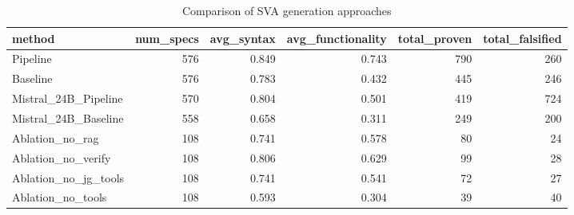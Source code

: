 \begin{table}[htbp]
\centering
\caption{Comparison of SVA generation approaches}
\begin{tabular}{lrrrrr}
\toprule
method & num\_specs & avg\_syntax & avg\_functionality & total\_proven & total\_falsified \\
\midrule
Pipeline & 576 & 0.849 & 0.743 & 790 & 260 \\
Baseline & 576 & 0.783 & 0.432 & 445 & 246 \\
Mistral\_24B\_Pipeline & 570 & 0.804 & 0.501 & 419 & 724 \\
Mistral\_24B\_Baseline & 558 & 0.658 & 0.311 & 249 & 200 \\
Ablation\_no\_rag & 108 & 0.741 & 0.578 & 80 & 24 \\
Ablation\_no\_verify & 108 & 0.806 & 0.629 & 99 & 28 \\
Ablation\_no\_jg\_tools & 108 & 0.741 & 0.541 & 72 & 27 \\
Ablation\_no\_tools & 108 & 0.593 & 0.304 & 39 & 40 \\
\bottomrule
\end{tabular}
\end{table}